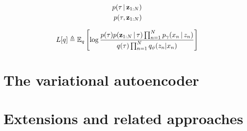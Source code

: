 \begin{align*}
    p(\tau \,|\, \mathbf{z}_{1:N}) \\
    p(\tau, \mathbf{z}_{1:N})
\end{align*}

\begin{align*}
  L[q] \triangleq \mathbb{E}_q\left[\log \frac{p(\tau)p(\mathbf{z}_{1:N} \,|\, \tau)\prod_{n = 1}^N p_\gamma(x_n \,|\, z_n)}
  {q(\tau)\prod_{n = 1}^N q_\phi(z_n | x_n)}\right]
\end{align*}
    
\section{The variational autoencoder}

\section{Extensions and related approaches}
